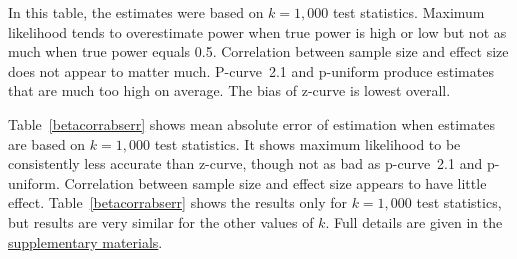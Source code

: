 \documentclass[jou]{apa6} %
\begin{document}
In this table, the estimates were based on $k=1,000$ test statistics. Maximum likelihood tends to overestimate power when true power is high or low but not as much when true power equals 0.5. Correlation between sample size and effect size does not appear to matter much. P-curve~2.1 and p-uniform produce estimates that are much too high on average. The bias of z-curve is lowest overall.

Table~\ref{betacorrabserr} shows mean absolute error of estimation when estimates are based on $k=1,000$ test statistics. It shows maximum likelihood to be consistently less accurate than z-curve, though not as bad as p-curve~2.1 and p-uniform. Correlation between sample size and effect size appears to have little effect. Table~\ref{betacorrabserr} shows the results only for $k=1,000$ test statistics, but results are very similar for the other values of $k$. Full details are given in the \href{http://www.utstat.toronto.edu/~brunner/zcurve2018} {supplementary materials}. 
\end{document}
